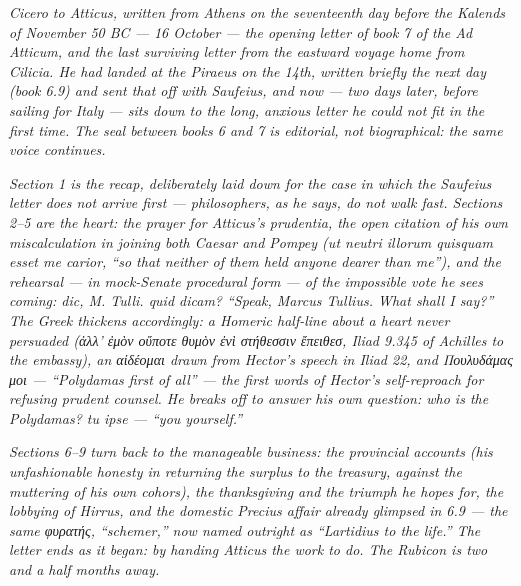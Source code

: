 
\textit{Cicero to Atticus, written from Athens on the
seventeenth day before the Kalends of November 50 BC ---
16 October --- the opening letter of book 7 of the
\textit{Ad Atticum}, and the last surviving letter from
the eastward voyage home from Cilicia. He had landed at
the Piraeus on the 14th, written briefly the next day
(book 6.9) and sent that off with Saufeius, and now ---
two days later, before sailing for Italy --- sits down
to the long, anxious letter he could not fit in the
first time. The seal between books 6 and 7 is editorial,
not biographical: the same voice continues.}

\textit{Section 1 is the recap, deliberately laid down
for the case in which the Saufeius letter does not arrive
first --- philosophers, as he says, do not walk fast.
Sections 2--5 are the heart: the prayer for Atticus's
\textit{prudentia}, the open citation of his own
miscalculation in joining both Caesar and Pompey
(\textit{ut neutri illorum quisquam esset me carior},
``so that neither of them held anyone dearer than me''),
and the rehearsal --- in mock-Senate procedural form ---
of the impossible vote he sees coming: \textit{dic, M.
Tulli. quid dicam?} ``Speak, Marcus Tullius. What shall
I say?'' The Greek thickens accordingly: a Homeric
half-line about a heart never persuaded
(\emph{ἀλλ' ἐμὸν οὔποτε θυμὸν ἐνὶ στήθεσσιν ἔπειθεσ},
\textit{Iliad} 9.345 of Achilles to the embassy), an
\emph{αἰδέομαι} drawn from Hector's speech in
\textit{Iliad} 22, and \emph{Πουλυδάμας μοι} ---
``Polydamas first of all'' --- the first words of Hector's
self-reproach for refusing prudent counsel. He breaks off
to answer his own question: who is the Polydamas?
\textit{tu ipse} --- ``you yourself.''}

\textit{Sections 6--9 turn back to the manageable
business: the provincial accounts (his unfashionable
honesty in returning the surplus to the treasury, against
the muttering of his own \textit{cohors}), the
thanksgiving and the triumph he hopes for, the lobbying of
Hirrus, and the domestic Precius affair already
glimpsed in 6.9 --- the same \emph{φυρατής}, ``schemer,''
now named outright as ``Lartidius to the life.'' The
letter ends as it began: by handing Atticus the work to
do. The Rubicon is two and a half months away.}
